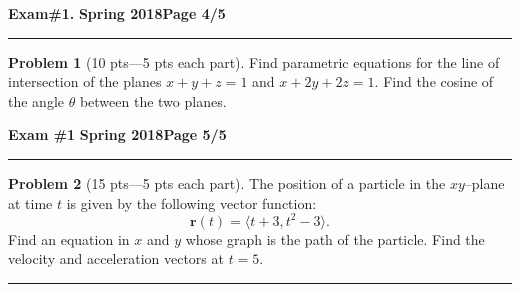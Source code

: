 \documentclass[12pt]{article}
\theoremstyle{definition}
\newtheorem{problem}{Problem}
\begin{document}
\hfill{\large\bf Exam\#1.}\hfill{\large\bf
  Spring 2018}\hfill{\large\bf Page 4/5}\hrule

\bigskip
\begin{problem}[10 pts---5 pts each part]
Find parametric equations for the line of intersection of the planes $x+y+z=1$ and $x+2y+2z=1$.  Find the cosine of the angle $\theta$ between the two planes.
\vspace{16.5cm}
\begin{flushright}
\end{flushright}
\end{problem}


\hfill{\large\bf Exam \#1}\hfill{\large\bf
  Spring 2018}\hfill{\large\bf Page 5/5}\hrule

\bigskip
\begin{problem}[15 pts---5 pts each part]
The position of a particle in the $xy$--plane at time $t$ is given by the following vector function:
\begin{equation*}
\boldsymbol{r}(t) = \langle t+3, t^2-3 \rangle.
\end{equation*}
Find an equation in $x$ and $y$ whose graph is the path of the particle.  Find the velocity and acceleration vectors at $t=5$.
\vspace{5cm}
\begin{flushright}
\end{flushright}
\begin{flushright}
\end{flushright}
\begin{flushright}
\end{flushright}
\end{problem}
\hrule
\end{document}

